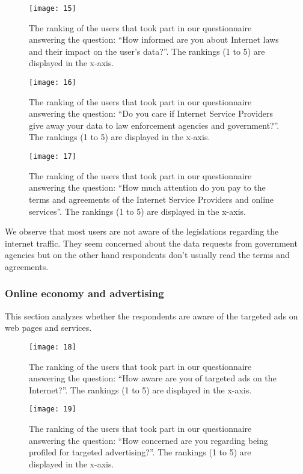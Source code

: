 \begin{figure}[H]
\centering
\texttt{[image: 15]}
\caption{The ranking of the users that took part in our questionnaire answering
the question: ``How informed are you about Internet laws and their impact on the 
user's data?''. The rankings (1 to 5) are displayed in the x-axis.}
\end{figure}

\begin{figure}[H]
\centering
\texttt{[image: 16]}
\caption{The ranking of the users that took part in our questionnaire answering
the question: ``Do you care if Internet Service Providers give away your data to 
law enforcement agencies and government?''. The
rankings (1 to 5) are displayed in the x-axis.}
\end{figure}

\begin{figure}[H]
\centering
\texttt{[image: 17]}
\caption{The ranking of the users that took part in our questionnaire answering
the question: ``How much attention do you pay to the terms and agreements of the 
Internet Service Providers and online services''. The rankings (1 to 5) are 
displayed in the x-axis.}
\end{figure}

We observe that most users are not aware of the legislations regarding the 
internet traffic. They seem concerned about the data requests from government 
agencies but on the other hand respondents don't usually read the terms and 
agreements.

\subsubsection{Online economy and advertising}

This section analyzes whether the respondents are aware of the targeted ads on 
web pages and services.

\begin{figure}[H]
\centering
\texttt{[image: 18]}
\caption{The ranking of the users that took part in our questionnaire answering
the question: ``How aware are you of targeted ads on the Internet?''. The
rankings (1 to 5) are displayed in the x-axis.}
\end{figure}

\begin{figure}[H]
\centering
\texttt{[image: 19]}
\caption{The ranking of the users that took part in our questionnaire answering
the question: ``How concerned are you regarding being profiled for targeted 
advertising?''. The rankings (1 to 5) are displayed in the x-axis.}
\end{figure}

